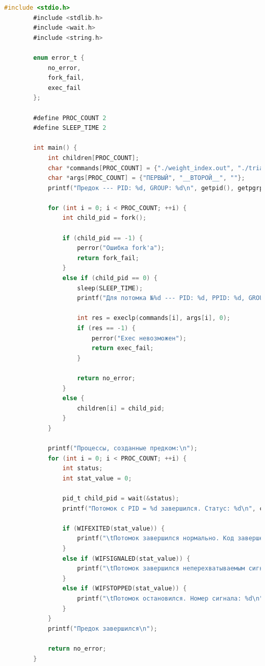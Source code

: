 \documentclass[12pt]{report}
\begin{document}
	\begin{lstlisting}[label=code:exec, caption=exec(), language=C]
		#include <stdio.h>
		#include <stdlib.h>
		#include <wait.h>
		#include <string.h>
		
		enum error_t {
			no_error,
			fork_fail,
			exec_fail
		};
		
		#define PROC_COUNT 2
		#define SLEEP_TIME 2
		
		int main() {
			int children[PROC_COUNT];
			char *commands[PROC_COUNT] = {"./weight_index.out", "./triangle_type.out"};
			char *args[PROC_COUNT] = {"ПЕРВЫЙ", "__ВТОРОЙ__", ""};
			printf("Предок --- PID: %d, GROUP: %d\n", getpid(), getpgrp());
			
			for (int i = 0; i < PROC_COUNT; ++i) {
				int child_pid = fork();
				
				if (child_pid == -1) {
					perror("Ошибка fork'а");
					return fork_fail;
				}
				else if (child_pid == 0) {
					sleep(SLEEP_TIME);
					printf("Для потомка №%d --- PID: %d, PPID: %d, GROUP: %d\n", i + 1, getpid(), getppid(), getpgrp());
					
					int res = execlp(commands[i], args[i], 0);
					if (res == -1) {
						perror("Exec невозможен");
						return exec_fail;
					}
					
					return no_error;
				}
				else {
					children[i] = child_pid;
				}
			}
			
			printf("Процессы, созданные предком:\n");
			for (int i = 0; i < PROC_COUNT; ++i) {
				int status;
				int stat_value = 0;
				
				pid_t child_pid = wait(&status);
				printf("Потомок с PID = %d завершился. Статус: %d\n", children[i], status);
				
				if (WIFEXITED(stat_value)) {
					printf("\tПотомок завершился нормально. Код завершения: %d\n", WEXITSTATUS(stat_value));
				}
				else if (WIFSIGNALED(stat_value)) {
					printf("\tПотомок завершился неперехватываемым сигналом. Номер сигнала: %d\n", WTERMSIG(stat_value));
				}
				else if (WIFSTOPPED(stat_value)) {
					printf("\tПотомок остановился. Номер сигнала: %d\n", WSTOPSIG(stat_value));
				}
			}
			printf("Предок завершился\n");
			
			return no_error;
		}
	\end{lstlisting}
\end{document}
